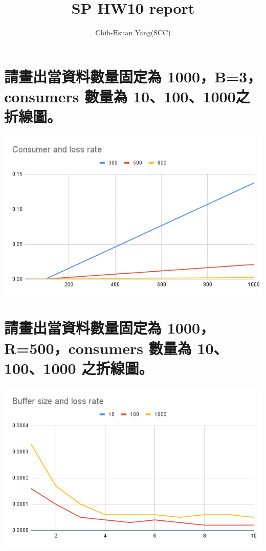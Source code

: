 \documentclass[a4paper, 12pt]{article}
\title{SP HW10 report}
\author{Chih-Hsuan Yang(SCC)}
\begin{document}
\begin{CJK*}{UTF8}{bsmi}
    \maketitle
    \newpage

    \section{請畫出當資料數量固定為 1000，B=3，consumers 數量為 10、100、1000之折線圖。}
    \includegraphics[width=\textwidth]{images/Consumer and loss rate.png}
    \label{fig1}

    \section{請畫出當資料數量固定為 1000，R=500，consumers 數量為 10、100、1000 之折線圖。}
    \includegraphics[width=\textwidth]{images/Buffer size and loss rate.png}


\end{CJK*}
\end{document}
